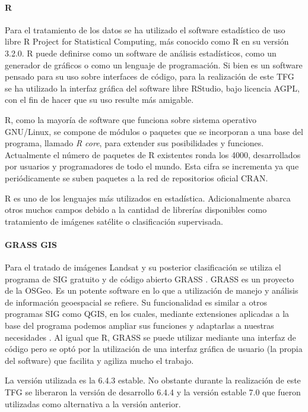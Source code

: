 \paragraph{R}
Para el tratamiento de los datos se ha utilizado el software estadístico de uso libre R Project for Statistical Computing, más conocido como R \citep{R2013} en su versión 3.2.0. R puede definirse como un software de análisis estadísticos, como un generador de gráficos o como un lenguaje de programación. Si bien es un software pensado para su uso sobre interfaces de código, para la realización de este \ac{TFG} se ha utilizado la interfaz gráfica del software libre RStudio, bajo licencia AGPL, con el fin de hacer que su uso resulte más amigable.\Sep

R, como la mayoría de software que funciona sobre sistema operativo GNU/Linux, se compone de módulos o paquetes que se incorporan a una base del programa, llamado \textit{R core}, para extender sus posibilidades y funciones. Actualmente el número de paquetes de R existentes ronda los 4000, desarrollados por usuarios y programadores de todo el mundo. Esta cifra se incrementa ya que periódicamente se suben paquetes a la red de repositorios oficial \ac{CRAN}.\Sep

R es uno de los lenguajes más utilizados en estadística. Adicionalmente abarca otros muchos campos debido a la cantidad de librerías disponibles como tratamiento de imágenes satélite o clasificación supervisada.

\paragraph{GRASS GIS}
Para el tratado de imágenes Landsat y su posterior clasificación se utiliza el programa de \ac{SIG} gratuito y de código abierto \ac{GRASS} \citep{GRASS_GIS_software}. GRASS es un proyecto de la \ac{OSGeo}. Es un potente software en lo que a utilización de manejo y análisis de información geoespacial se refiere. Su funcionalidad es similar a otros programas \ac{SIG} como QGIS, en los cuales, mediante extensiones aplicadas a la base del programa podemos ampliar sus funciones y adaptarlas a nuestras necesidades \citep{neteler2002open}. Al igual que R, \ac{GRASS} se puede utilizar mediante una interfaz de código pero se optó por la utilización de una interfaz gráfica de usuario (la propia del software) que facilita y agiliza mucho el trabajo.\Sep

La versión utilizada es la 6.4.3 estable. No obstante durante la realización de este \ac{TFG} se liberaron la versión de desarrollo 6.4.4 y la versión estable 7.0 que fueron utilizadas como alternativa a la versión anterior.

